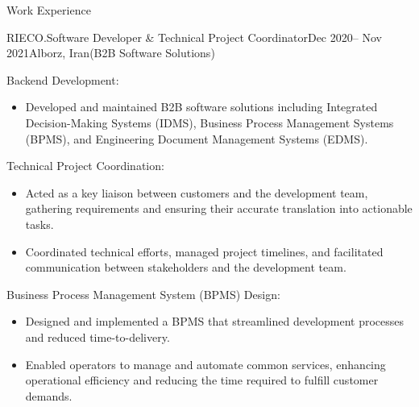 \documentclass[]{kyvernitis-resume}
\begin{document}
\begin{section}{Work Experience}
 \begin{subsection}{RIECO.}{Software Developer  \& Technical Project Coordinator}{Dec 2020-- Nov 2021}{Alborz, Iran}{(B2B Software Solutions)}
	\item Backend Development:
		\begin{itemize}
			\item Developed and maintained B2B software solutions including Integrated Decision-Making Systems (IDMS), Business Process Management Systems (BPMS), and Engineering Document Management Systems (EDMS).
		\end{itemize}

	\item Technical Project Coordination:
		\begin{itemize}
			\item Acted as a key liaison between customers and the development team, gathering requirements and ensuring their accurate translation into actionable tasks.
			\item Coordinated technical efforts, managed project timelines, and facilitated communication between stakeholders and the development team.
		\end{itemize}

	\item Business Process Management System (BPMS) Design:
		\begin{itemize}
			\item Designed and implemented a BPMS that streamlined development processes and reduced time-to-delivery.
			\item Enabled operators to manage and automate common services, enhancing operational efficiency and reducing the time required to fulfill customer demands.
		\end{itemize}
	

\end{subsection}
\end{section}
\end{document}
